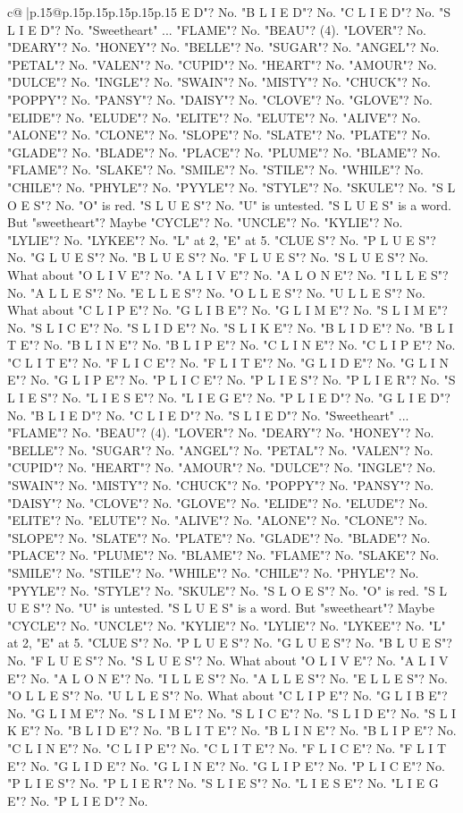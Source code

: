 \documentclass{article}
\begin{document}
{\begin{supertabular}{c@{$\;$}|p{.15\linewidth}@{}p{.15\linewidth}p{.15\linewidth}p{.15\linewidth}p{.15\linewidth}p{.15\linewidth}}
{{{E D"? No. "B L I E D"? No. "C L I E D"? No. "S L I E D"? No. "Sweetheart" ... "FLAME"? No. "BEAU"? (4). "LOVER"? No. "DEARY"? No. "HONEY"? No. "BELLE"? No. "SUGAR"? No. "ANGEL"? No. "PETAL"? No. "VALEN"? No. "CUPID"? No. "HEART"? No. "AMOUR"? No. "DULCE"? No. "INGLE"? No. "SWAIN"? No. "MISTY"? No. "CHUCK"? No. "POPPY"? No. "PANSY"? No. "DAISY"? No. "CLOVE"? No. "GLOVE"? No. "ELIDE"? No. "ELUDE"? No. "ELITE"? No. "ELUTE"? No. "ALIVE"? No. "ALONE"? No. "CLONE"? No. "SLOPE"? No. "SLATE"? No. "PLATE"? No. "GLADE"? No. "BLADE"? No. "PLACE"? No. "PLUME"? No. "BLAME"? No. "FLAME"? No. "SLAKE"? No. "SMILE"? No. "STILE"? No. "WHILE"? No. "CHILE"? No. "PHYLE"? No. "PYYLE"? No. "STYLE"? No. "SKULE"? No. "S L O E S"? No. "O" is red. "S L U E S"? No. "U" is untested. "S L U E S" is a word. But "sweetheart"? Maybe "CYCLE"? No. "UNCLE"? No. "KYLIE"? No. "LYLIE"? No. "LYKEE"? No. "L" at 2, "E" at 5. "CLUE S"? No. "P L U E S"? No. "G L U E S"? No. "B L U E S"? No. "F L U E S"? No. "S L U E S"? No. What about "O L I V E"? No. "A L I V E"? No. "A L O N E"? No. "I L L E S"? No. "A L L E S"? No. "E L L E S"? No. "O L L E S"? No. "U L L E S"? No. What about "C L I P E"? No. "G L I B E"? No. "G L I M E"? No. "S L I M E"? No. "S L I C E"? No. "S L I D E"? No. "S L I K E"? No. "B L I D E"? No. "B L I T E"? No. "B L I N E"? No. "B L I P E"? No. "C L I N E"? No. "C L I P E"? No. "C L I T E"? No. "F L I C E"? No. "F L I T E"? No. "G L I D E"? No. "G L I N E"? No. "G L I P E"? No. "P L I C E"? No. "P L I E S"? No. "P L I E R"? No. "S L I E S"? No. "L I E S E"? No. "L I E G E"? No. "P L I E D"? No. "G L I E D"? No. "B L I E D"? No. "C L I E D"? No. "S L I E D"? No. "Sweetheart" ... "FLAME"? No. "BEAU"? (4). "LOVER"? No. "DEARY"? No. "HONEY"? No. "BELLE"? No. "SUGAR"? No. "ANGEL"? No. "PETAL"? No. "VALEN"? No. "CUPID"? No. "HEART"? No. "AMOUR"? No. "DULCE"? No. "INGLE"? No. "SWAIN"? No. "MISTY"? No. "CHUCK"? No. "POPPY"? No. "PANSY"? No. "DAISY"? No. "CLOVE"? No. "GLOVE"? No. "ELIDE"? No. "ELUDE"? No. "ELITE"? No. "ELUTE"? No. "ALIVE"? No. "ALONE"? No. "CLONE"? No. "SLOPE"? No. "SLATE"? No. "PLATE"? No. "GLADE"? No. "BLADE"? No. "PLACE"? No. "PLUME"? No. "BLAME"? No. "FLAME"? No. "SLAKE"? No. "SMILE"? No. "STILE"? No. "WHILE"? No. "CHILE"? No. "PHYLE"? No. "PYYLE"? No. "STYLE"? No. "SKULE"? No. "S L O E S"? No. "O" is red. "S L U E S"? No. "U" is untested. "S L U E S" is a word. But "sweetheart"? Maybe "CYCLE"? No. "UNCLE"? No. "KYLIE"? No. "LYLIE"? No. "LYKEE"? No. "L" at 2, "E" at 5. "CLUE S"? No. "P L U E S"? No. "G L U E S"? No. "B L U E S"? No. "F L U E S"? No. "S L U E S"? No. What about "O L I V E"? No. "A L I V E"? No. "A L O N E"? No. "I L L E S"? No. "A L L E S"? No. "E L L E S"? No. "O L L E S"? No. "U L L E S"? No. What about "C L I P E"? No. "G L I B E"? No. "G L I M E"? No. "S L I M E"? No. "S L I C E"? No. "S L I D E"? No. "S L I K E"? No. "B L I D E"? No. "B L I T E"? No. "B L I N E"? No. "B L I P E"? No. "C L I N E"? No. "C L I P E"? No. "C L I T E"? No. "F L I C E"? No. "F L I T E"? No. "G L I D E"? No. "G L I N E"? No. "G L I P E"? No. "P L I C E"? No. "P L I E S"? No. "P L I E R"? No. "S L I E S"? No. "L I E S E"? No. "L I E G E"? No. "P L I E D"? No. }}}
\end{supertabular}}
\end{document}
